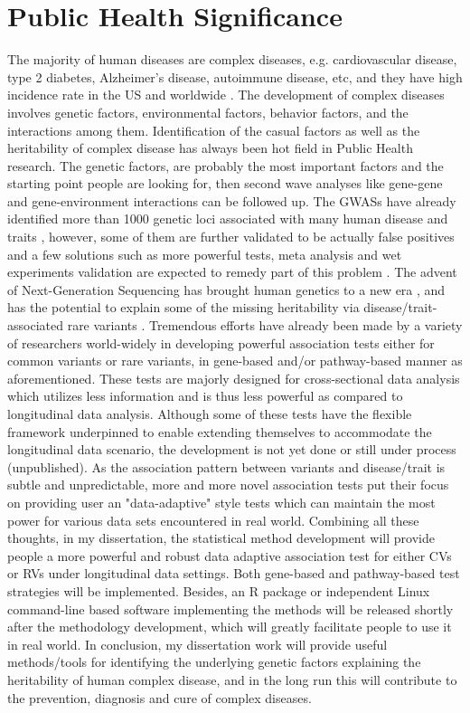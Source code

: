\documentclass[12pt]{article}
\begin{document}
\section{Public Health Significance}
The majority of human diseases are complex diseases, e.g. cardiovascular disease, type 2 diabetes, Alzheimer's disease, autoimmune disease, etc, and they have high incidence rate in the US and worldwide \cite{Craig2008,Cardon2001,Hirschhorn2005}. The development of complex diseases involves genetic factors, environmental factors, behavior factors, and the interactions among them. Identification of the casual factors as well as the heritability of complex disease has always been hot field in Public Health research. The genetic factors, are probably the most important factors and the starting point people are looking for, then second wave analyses like gene-gene and gene-environment interactions can be followed up. The GWASs have already identified more than 1000 genetic loci associated with many human disease and traits \cite{Hindorff2009}, however, some of them are further validated to be actually false positives and a few solutions such as more powerful tests, meta analysis and wet experiments validation are expected to remedy part of this problem \cite{Wang2005,Hirschhorn2005,McCarthy2008,Hindorff2009,Cantor2010}. The advent of Next-Generation Sequencing has brought human genetics to a new era \cite{Ansorge2009,Metzker2009,Mardis2008,Shendure2008}, and has the potential to explain some of the missing heritability via disease/trait-associated rare variants \cite{Eichler2010}. Tremendous efforts have already been made by a variety of researchers world-widely in developing powerful association tests either for common variants or rare variants, in gene-based and/or pathway-based manner as aforementioned. These tests are majorly designed for cross-sectional data analysis which utilizes less information and is thus less powerful as compared to longitudinal data analysis. Although some of these tests have the flexible framework underpinned to enable extending themselves to accommodate the longitudinal data scenario, the development is not yet done or still under process (unpublished). As the association pattern between variants and disease/trait is subtle and unpredictable, more and more novel association tests put their focus on providing user an "data-adaptive" style tests which can maintain the most power for various data sets encountered in real world. Combining all these thoughts, in my dissertation, the statistical method development will provide people a more powerful and robust data adaptive association test for either CVs or RVs under longitudinal data settings. Both gene-based and pathway-based test strategies will be implemented. Besides, an R package or independent Linux command-line based software implementing the methods will be released shortly after the methodology development, which will greatly facilitate people to use it in real world. In conclusion, my dissertation work will provide useful methods/tools for identifying the underlying genetic factors explaining the heritability of human complex disease, and in the long run this will contribute to the prevention, diagnosis and cure of complex diseases.
\end{document}
